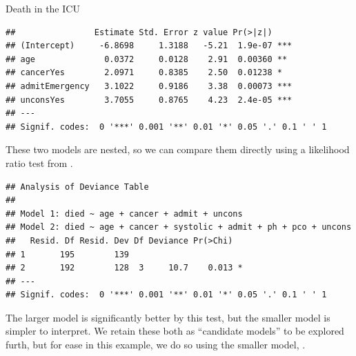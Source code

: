 \documentclass[11pt]{book}
\renewenvironment{knitrout}{\small\renewcommand{\baselinestretch}{.85}}{} %
\begin{document}
\begin{Example}[icu1]{Death in the ICU}
\begin{knitrout}
\begin{kframe}
\begin{verbatim}
##                Estimate Std. Error z value Pr(>|z|)    
## (Intercept)     -6.8698     1.3188   -5.21  1.9e-07 ***
## age              0.0372     0.0128    2.91  0.00360 ** 
## cancerYes        2.0971     0.8385    2.50  0.01238 *  
## admitEmergency   3.1022     0.9186    3.38  0.00073 ***
## unconsYes        3.7055     0.8765    4.23  2.4e-05 ***
## ---
## Signif. codes:  0 '***' 0.001 '**' 0.01 '*' 0.05 '.' 0.1 ' ' 1
\end{verbatim}
\end{kframe}
\end{knitrout}
These two models are nested, so we can compare them directly using a likelihood ratio
test from .
\begin{knitrout}
\color{fgcolor}\begin{kframe}
\begin{alltt}
 \hlstd{=}\hlstd{)}
\end{alltt}
\begin{verbatim}
## Analysis of Deviance Table
## 
## Model 1: died ~ age + cancer + admit + uncons
## Model 2: died ~ age + cancer + systolic + admit + ph + pco + uncons
##   Resid. Df Resid. Dev Df Deviance Pr(>Chi)  
## 1       195        139                       
## 2       192        128  3     10.7    0.013 *
## ---
## Signif. codes:  0 '***' 0.001 '**' 0.01 '*' 0.05 '.' 0.1 ' ' 1
\end{verbatim}
\end{kframe}
\end{knitrout}
The larger model is significantly better by this test, but the smaller model is 
simpler to interpret. We retain these both as ``candidate models'' to be explored furth,
but for ease in this example, we do so using the smaller model, .


\end{Example}
\end{document}
